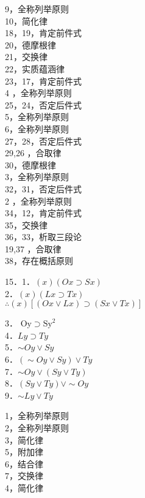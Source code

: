 9，全称列举原则\\
10，简化律\\
18，19，肯定前件式\\
20，德摩根律\\
21，交换律\\
22，实质蕴涵律\\
23，17，肯定前件式\\
4 ，全称列举原则\\
25，24，否定后件式\\
5，全称列举原则\\
6，全称列举原则\\
27，28，否定后件式\\
29,26 ，合取律\\
30，德摩根律\\
3，全称列举原则\\
32，31，否定后件式\\
2 ，全称列举原则\\
34，12，肯定前件式\\
35，交换律\\
36，33，析取三段论\\
19,37 ，合取律\\
38，存在概括原则

15．1．$(x)(O x \supset S x)$\\
2．$(x)(L x \supset T x)$\\
$\therefore(x)[(O x \vee L x) \supset(S x \vee T x)]$

3． $\mathrm{Oy} \supset \mathrm{Sy}^{2}$\\
4．$L y \supset T y$\\
5．$\sim O y \vee S y$\\
6．$(\sim O y \vee S y) \vee T y$\\
7．$\sim O y \vee(S y \vee T y)$\\
8．$(S y \vee T y) \vee \sim O y$\\
9．$\sim L y \vee T y$

1，全称列举原则\\
2，全称列举原则\\
3，简化律\\
5，附加律\\
6，结合律\\
7，交换律\\
4，简化律

